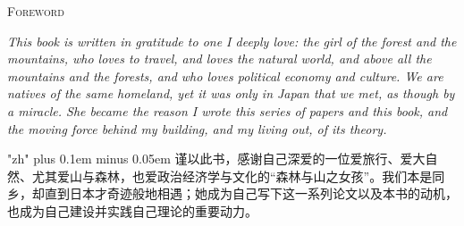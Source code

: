 \thispagestyle{empty}
\vspace*{0.15\textheight}
\begin{center}
{\scshape\color{rosedeep}\Large Foreword}\\[2.0em]
\begin{minipage}{0.80\linewidth}
\itshape\color{ink}
\noindent
This book is written in gratitude to one I deeply love: the girl of the forest and the mountains, who loves to travel, and loves the natural world, and above all the mountains and the forests, and who loves political economy and culture. We are natives of the same homeland, yet it was only in Japan that we met, as though by a miracle. She became the reason I wrote this series of papers and this book, and the moving force behind my building, and my living out, of its theory.

\vspace{1.8em}

\upshape\cjkfont\color{rosedeep}
\XeTeXlinebreaklocale "zh"
\XeTeXlinebreakskip=0pt plus 0.1em minus 0.05em
\noindent
谨以此书，感谢自己深爱的一位爱旅行、爱大自然、尤其爱山与森林，也爱政治经济学与文化的“森林与山之女孩”。我们本是同乡，却直到日本才奇迹般地相遇；她成为自己写下这一系列论文以及本书的动机，也成为自己建设并实践自己理论的重要动力。
\end{minipage}
\end{center}
\vfill
\clearpage
